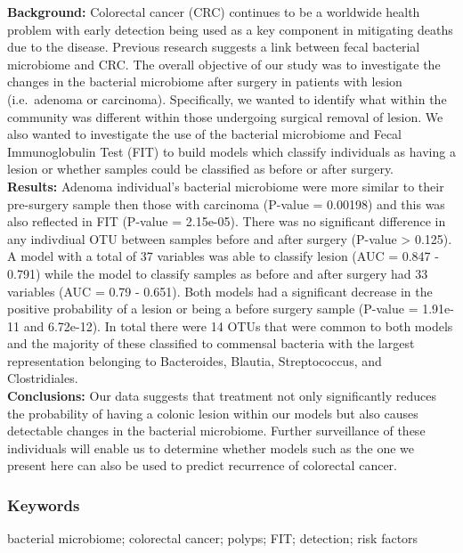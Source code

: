 \documentclass[12pt,]{article}
\begin{document}
\textbf{Background:} Colorectal cancer (CRC) continues to be a worldwide
health problem with early detection being used as a key component in
mitigating deaths due to the disease. Previous research suggests a link
between fecal bacterial microbiome and CRC. The overall objective of our
study was to investigate the changes in the bacterial microbiome after
surgery in patients with lesion (i.e.~adenoma or carcinoma).
Specifically, we wanted to identify what within the community was
different within those undergoing surgical removal of lesion. We also
wanted to investigate the use of the bacterial microbiome and Fecal
Immunoglobulin Test (FIT) to build models which classify individuals as
having a lesion or whether samples could be classified as before or
after surgery.\\
\textbf{Results:} Adenoma individual's bacterial microbiome were more
similar to their pre-surgery sample then those with carcinoma (P-value =
0.00198) and this was also reflected in FIT (P-value = 2.15e-05). There
was no significant difference in any indivdiual OTU between samples
before and after surgery (P-value \textgreater{} 0.125). A model with a
total of 37 variables was able to classify lesion (AUC = 0.847 - 0.791)
while the model to classify samples as before and after surgery had 33
variables (AUC = 0.79 - 0.651). Both models had a significant decrease
in the positive probability of a lesion or being a before surgery sample
(P-value = 1.91e-11 and 6.72e-12). In total there were 14 OTUs that were
common to both models and the majority of these classified to commensal
bacteria with the largest representation belonging to Bacteroides,
Blautia, Streptococcus, and Clostridiales.\\
\textbf{Conclusions:} Our data suggests that treatment not only
significantly reduces the probability of having a colonic lesion within
our models but also causes detectable changes in the bacterial
microbiome. Further surveillance of these individuals will enable us to
determine whether models such as the one we present here can also be
used to predict recurrence of colorectal cancer.

\newpage

\subsubsection{Keywords}\label{keywords}

bacterial microbiome; colorectal cancer; polyps; FIT; detection; risk
factors
\end{document}
